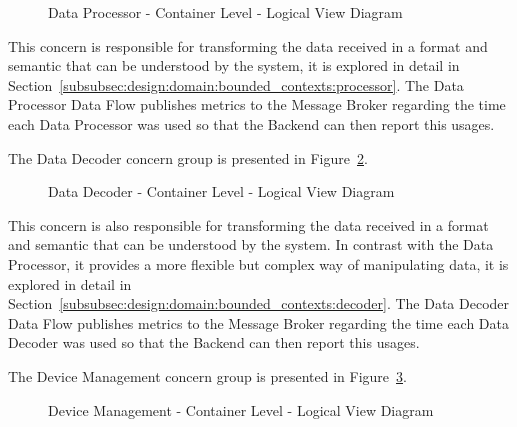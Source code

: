 \begin{figure}[H]
   \centering
   \resizebox{\columnwidth}{!}
       {
       
       }
   \caption[Data Processor - Container Level - Logical View Diagram]{Data Processor - Container Level - Logical View Diagram}
   \label{fig:design:architecture:platform:containers:logical:processor}
\end{figure}

This concern is responsible for transforming the data received in a format and semantic that can be understood by the system, it is explored in detail in Section~\ref{subsubsec:design:domain:bounded_contexts:processor}. The Data Processor Data Flow publishes metrics to the Message Broker regarding the time each Data Processor was used so that the Backend can then report this usages.

The Data Decoder concern group is presented in Figure~\ref{fig:design:architecture:platform:containers:logical:decoder}.

\begin{figure}[H]
   \centering
   \resizebox{\columnwidth}{!}
       {
       
       }
   \caption[Data Decoder - Container Level - Logical View Diagram]{Data Decoder - Container Level - Logical View Diagram}
   \label{fig:design:architecture:platform:containers:logical:decoder}
\end{figure}

This concern is also responsible for transforming the data received in a format and semantic that can be understood by the system. In contrast with the Data Processor, it provides a more flexible but complex way of manipulating data, it is explored in detail in Section~\ref{subsubsec:design:domain:bounded_contexts:decoder}. The Data Decoder Data Flow publishes metrics to the Message Broker regarding the time each Data Decoder was used so that the Backend can then report this usages.

The Device Management concern group is presented in Figure~\ref{fig:design:architecture:platform:containers:logical:device}.

\begin{figure}[H]
   \centering
   \resizebox{\columnwidth}{!}
       {
       
       }
   \caption[Device Management - Container Level - Logical View Diagram]{Device Management - Container Level - Logical View Diagram}
   \label{fig:design:architecture:platform:containers:logical:device}
\end{figure}

